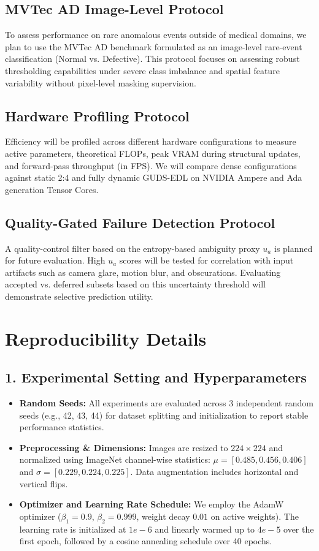 \documentclass[letterpaper]{article} %
\begin{document}
\subsection{MVTec AD Image-Level Protocol}
To assess performance on rare anomalous events outside of medical domains, we plan to use the MVTec AD benchmark formulated as an image-level rare-event classification (Normal vs. Defective). This protocol focuses on assessing robust thresholding capabilities under severe class imbalance and spatial feature variability without pixel-level masking supervision.

\subsection{Hardware Profiling Protocol}
Efficiency will be profiled across different hardware configurations to measure active parameters, theoretical FLOPs, peak VRAM during structural updates, and forward-pass throughput (in FPS). We will compare dense configurations against static 2:4 and fully dynamic GUDS-EDL on NVIDIA Ampere and Ada generation Tensor Cores.

\subsection{Quality-Gated Failure Detection Protocol}
A quality-control filter based on the entropy-based ambiguity proxy $u_a$ is planned for future evaluation. High $u_a$ scores will be tested for correlation with input artifacts such as camera glare, motion blur, and obscurations. Evaluating accepted vs. deferred subsets based on this uncertainty threshold will demonstrate selective prediction utility.

\section{Reproducibility Details}

\subsection*{1. Experimental Setting and Hyperparameters}
\begin{itemize}
    \item \textbf{Random Seeds:} All experiments are evaluated across 3 independent random seeds (e.g., 42, 43, 44) for dataset splitting and initialization to report stable performance statistics.
    \item \textbf{Preprocessing \& Dimensions:} Images are resized to $224 \times 224$ and normalized using ImageNet channel-wise statistics: $\mu = [0.485, 0.456, 0.406]$ and $\sigma = [0.229, 0.224, 0.225]$. Data augmentation includes horizontal and vertical flips.
    \item \textbf{Optimizer and Learning Rate Schedule:} We employ the AdamW optimizer ($\beta_1=0.9$, $\beta_2=0.999$, weight decay $0.01$ on active weights). The learning rate is initialized at $1e-6$ and linearly warmed up to $4e-5$ over the first epoch, followed by a cosine annealing schedule over 40 epochs.
\end{itemize}
\end{document}
